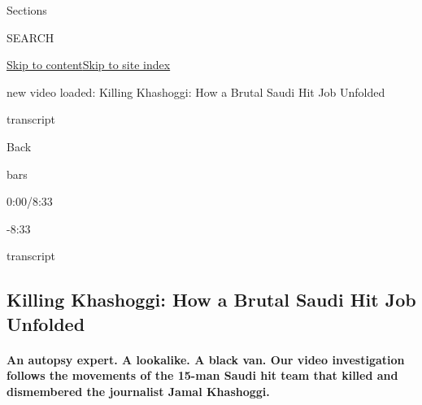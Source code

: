 Sections

SEARCH

\protect\hyperlink{site-content}{Skip to
content}\protect\hyperlink{site-index}{Skip to site index}

new video loaded: Killing Khashoggi: How a Brutal Saudi Hit Job Unfolded

transcript

Back

bars

0:00/8:33

-8:33

transcript

\hypertarget{killing-khashoggi-how-a-brutal-saudi-hit-job-unfolded}{%
\subsection{Killing Khashoggi: How a Brutal Saudi Hit Job
Unfolded}\label{killing-khashoggi-how-a-brutal-saudi-hit-job-unfolded}}

\hypertarget{an-autopsy-expert-a-lookalike-a-black-van-our-video-investigation-follows-the-movements-of-the-15-man-saudi-hit-team-that-killed-and-dismembered-the-journalist-jamal-khashoggi}{%
\paragraph{An autopsy expert. A lookalike. A black van. Our video
investigation follows the movements of the 15-man Saudi hit team that
killed and dismembered the journalist Jamal
Khashoggi.}\label{an-autopsy-expert-a-lookalike-a-black-van-our-video-investigation-follows-the-movements-of-the-15-man-saudi-hit-team-that-killed-and-dismembered-the-journalist-jamal-khashoggi}}

